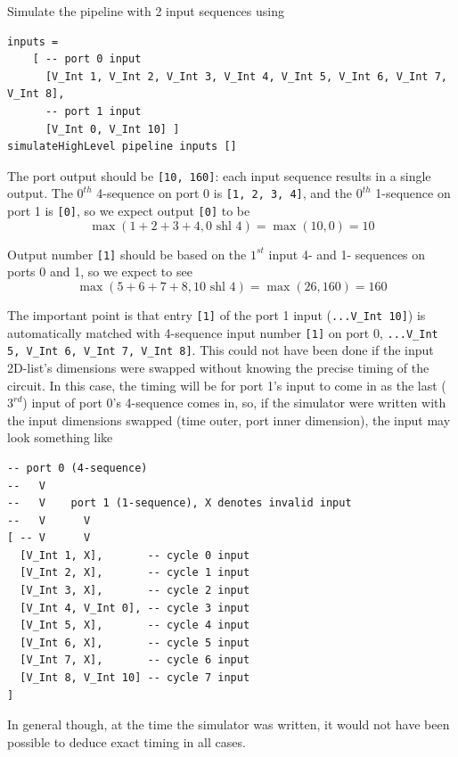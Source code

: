 \documentclass[12pt]{article}
\begin{document}
Simulate the pipeline with 2 input sequences using

\begin{verbatim}
inputs =
    [ -- port 0 input
      [V_Int 1, V_Int 2, V_Int 3, V_Int 4, V_Int 5, V_Int 6, V_Int 7, V_Int 8],
      -- port 1 input
      [V_Int 0, V_Int 10] ]
simulateHighLevel pipeline inputs []
\end{verbatim}

The port output should be \texttt{[10, 160]}: each input sequence
results in a single output. The $0^{th}$ 4-sequence on port 0 is
\texttt{[1, 2, 3, 4]}, and the $0^{th}$ 1-sequence on port 1 is
\texttt{[0]}, so we expect output \texttt{[0]} to be
\begin{equation}
    \max(1+2+3+4, 0 \text{ shl } 4) = \max(10, 0) = 10
\end{equation}

Output number \texttt{[1]} should be based on the $1^{st}$ input
4- and 1- sequences on ports 0 and 1, so we expect to see
\begin{equation}
    \max(5+6+7+8, 10 \text{ shl } 4) = \max(26, 160) = 160
\end{equation}

The important point is that entry \texttt{[1]} of the port 1 input
(\texttt{...V\_Int 10]}) is automatically matched with 4-sequence
input number \texttt{[1]} on port 0,
\texttt{...V\_Int 5, V\_Int 6, V\_Int 7, V\_Int 8]}. This could
not have been done if the input 2D-list's dimensions were swapped
without knowing the precise timing of the circuit. In this case,
the timing will be for port 1's input to come in as the last
($3^{rd}$) input of port 0's 4-sequence comes in, so, if the simulator
were written with the input dimensions swapped (time outer, port
inner dimension), the input may look something like

\begin{verbatim}
-- port 0 (4-sequence)
--   V
--   V    port 1 (1-sequence), X denotes invalid input
--   V      V
[ -- V      V
  [V_Int 1, X],       -- cycle 0 input
  [V_Int 2, X],       -- cycle 1 input
  [V_Int 3, X],       -- cycle 2 input
  [V_Int 4, V_Int 0], -- cycle 3 input
  [V_Int 5, X],       -- cycle 4 input
  [V_Int 6, X],       -- cycle 5 input
  [V_Int 7, X],       -- cycle 6 input
  [V_Int 8, V_Int 10] -- cycle 7 input
]
\end{verbatim}

In general though, at the time the simulator was written, it would not
have been possible to deduce exact timing in all cases.
\end{document}
